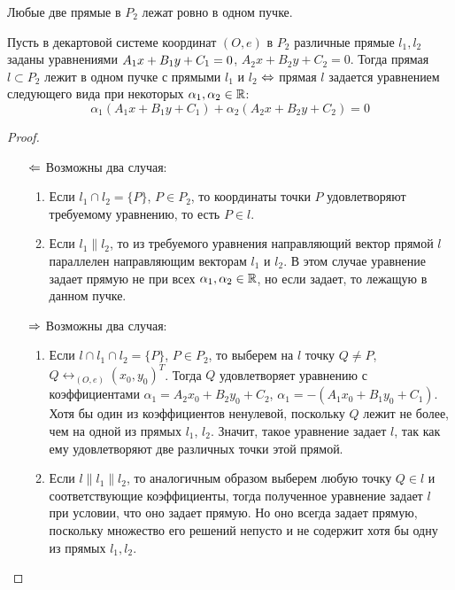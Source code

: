 \begin{note}
	Любые две прямые в $P_2$ лежат ровно в одном пучке.
\end{note}

\begin{theorem}
	Пусть в декартовой системе координат $(O, e)$ в $P_2$ различные прямые $l_1, l_2$ заданы уравнениями $A_1x\hm{+}B_1y+C_1=0$, $A_2x+B_2y+C_2=0$. Тогда прямая $l \subset P_2$ лежит в одном пучке с прямыми $l_1$ и $l_2$ $\Leftrightarrow$ прямая $l$ задается уравнением следующего вида при некоторых $\alpha_1, \alpha_2 \in \mathbb{R}$:
	\[\alpha_1(A_1x+B_1y+C_1) + \alpha_2(A_2x+B_2y+C_2) = 0\]
\end{theorem}

\begin{proof}~
	\begin{itemize}
		\item[$\Leftarrow$] Возможны два случая:
		\begin{enumerate}
			\item Если $l_1 \cap l_2 = \{P\}$, $P \in P_2$, то координаты точки $P$ удовлетворяют требуемому уравнению, то есть $P \in l$.
			\item Если $l_1 \parallel l_2$, то из требуемого уравнения направляющий вектор прямой $l$ параллелен направляющим векторам $l_1$ и $l_2$. В этом случае уравнение задает прямую не при всех $\alpha_1, \alpha_2 \in \mathbb{R}$, но если задает, то лежащую в данном пучке.
		\end{enumerate}
		
		\item[$\Rightarrow$] Возможны два случая:
		\begin{enumerate}
			\item Если $l \cap l_1 \cap l_2 = \{P\}$, $P \in P_2$, то выберем на $l$ точку $Q \ne P$, $Q \leftrightarrow_{(O, e)} (x_0, y_0)^T$. Тогда $Q$ удовлетворяет уравнению с коэффициентами $\alpha_1 = A_2x_0+B_2y_0+C_2$, $\alpha_1 = -(A_1x_0+B_1y_0+C_1)$. Хотя бы один из коэффициентов ненулевой, поскольку $Q$ лежит не более, чем на одной из прямых $l_1$, $l_2$. Значит, такое уравнение задает $l$, так как ему удовлетворяют две различных точки этой прямой.
			
			\item Если $l \parallel l_1 \parallel l_2$, то аналогичным образом выберем любую точку $Q \in l$ и соответствующие коэффициенты, тогда полученное уравнение задает $l$ при условии, что оно задает прямую. Но оно всегда задает прямую, поскольку множество его решений непусто и не содержит хотя бы одну из прямых $l_1, l_2$.\qedhere
		\end{enumerate}
	\end{itemize}
\end{proof}

